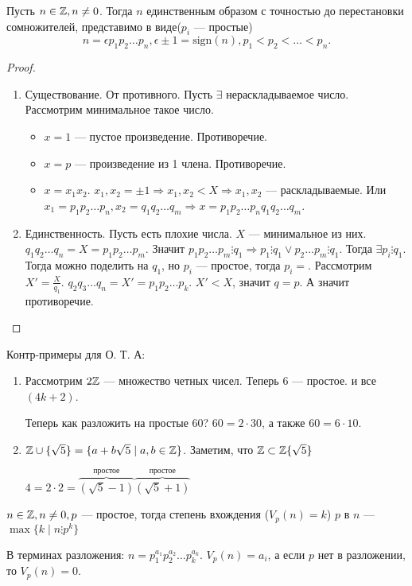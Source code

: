 \begin{theorem}
    Пусть $n \in \mathbb{Z}, n \neq 0$. Тогда  $n$ единственным образом с точностью до перестановки сомножителей, представимо в виде($p_i$ --- простые)  \[
        n = \epsilon p_1p_2\ldots p_n, \epsilon \pm 1 = \text{sign}(n), p_1 < p_2 < \ldots < p_n
    .\] 
\end{theorem}
\begin{proof}
\begin{enumerate}
    \item Существование. От противного. Пусть $\exists$ нераскладываемое число. Рассмотрим минимальное такое число.
        \begin{itemize}
            \item $x = 1$ --- пустое произведение. Противоречие.
            \item  $x = p$ --- произведение из 1 члена. Противоречие.
            \item  $x = x_1x_2$. $x_1,x_2 = \pm 1 \Rightarrow x_1, x_2 < X \Rightarrow x_1, x_2$ --- раскладываемые. Или $x_1 = p_1 p_2\ldots p_n, x_2 = q_1 q_2 \ldots q_m \Rightarrow x = p_1 p_2 \ldots p_n q_1 q_2 \ldots q_m$.
        \end{itemize}
    \item Единственность. Пусть есть плохие числа. $X$ --- минимальное из них.  $q_1 q_2 \ldots q_n = X = p_1 p_2 \ldots p_m$. Значит $p_1 p_2 \ldots p_m \vdots q_1 \Rightarrow p_1 \vdots q_1 \lor p_2\ldots p_m \vdots q_1$. Тогда $\exists p_i \vdots q_1$. Тогда можно поделить на  $q_1$, но $p_i$ --- простое, тогда  $p_i = $. Рассмотрим  $X' = \frac{X}{q_1}$. $q_2 q_3 \ldots q_n = X' = p_1 p_2 \ldots p_k$. $X' < X$, значит  $q = p$. А значит противоречие. 
\end{enumerate}
\end{proof}
Контр-примеры для О. Т. А:
\begin{enumerate}
    \item Рассмотрим $2\mathbb{Z}$ --- множество четных чисел. Теперь 6 --- простое. и все $(4k + 2)$.

        Теперь как разложить на простые 60?  $60 = 2 \cdot 30$, а также  $60 = 6 \cdot 10$.
    \item $\mathbb{Z} \cup \{\sqrt{5}\} = \{ a + b\sqrt{5} \mid a,b \in \mathbb{Z}\}$. Заметим, что  $\mathbb{Z} \subset \mathbb{Z}\{\sqrt{5}\}$

        $4 = 2 \cdot 2 = \overbrace{(\sqrt{5} - 1)}^{\text{простое}}\overbrace{(\sqrt{5} + 1)}^{\text{простое}}$
\end{enumerate}
\begin{definition}
    $n \in \mathbb{Z}, n \neq 0, p$ --- простое, тогда степень вхождения ($V_p(n) = k$)  $p$ в  $n$ ---  $\max\{k \mid n \vdots p^k\}$

    В терминах разложения: $n = p_1^{a_1} p_2^{a_2} \ldots p_k^{a_k}$. $V_p(n) = a_i$, а если  $p$ нет в разложении, то  $V_p(n) = 0$.
\end{definition}
